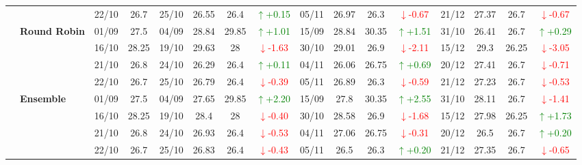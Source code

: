 {\begin{longtable}{llcc|cccc|cccc|cccc}
&
& 22/10 & 26.7 & 25/10 & 26.55 & 26.4 & \textcolor{green}{\(\uparrow\)+0.15} & 05/11 & 26.97 & 26.3 & \textcolor{red}{\(\downarrow\)-0.67} & 21/12 & 27.37 & 26.7 & \textcolor{red}{\(\downarrow\)-0.67} \\
\cmidrule(lr){2-16}


& \textbf{Round Robin}
& 01/09 & 27.5 & 04/09 & 28.84 & 29.85 & \textcolor{green}{\(\uparrow\)+1.01} & 15/09 & 28.84 & 30.35 & \textcolor{green}{\(\uparrow\)+1.51} & 31/10 & 26.41 & 26.7 & \textcolor{green}{\(\uparrow\)+0.29} \\

& 
& 16/10 & 28.25 & 19/10 & 29.63 & 28 & \textcolor{red}{\(\downarrow\)-1.63} & 30/10 & 29.01 & 26.9 & \textcolor{red}{\(\downarrow\)-2.11} & 15/12 & 29.3 & 26.25 & \textcolor{red}{\(\downarrow\)-3.05} \\

& 
& 21/10 & 26.8 & 24/10 & 26.29 & 26.4 & \textcolor{green}{\(\uparrow\)+0.11} & 04/11 & 26.06 & 26.75 & \textcolor{green}{\(\uparrow\)+0.69} & 20/12 & 27.41 & 26.7 & \textcolor{red}{\(\downarrow\)-0.71} \\

&
& 22/10 & 26.7 & 25/10 & 26.79 & 26.4 & \textcolor{red}{\(\downarrow\)-0.39} & 05/11 & 26.89 & 26.3 & \textcolor{red}{\(\downarrow\)-0.59} & 21/12 & 27.23 & 26.7 & \textcolor{red}{\(\downarrow\)-0.53} \\
\cmidrule(lr){2-16}


& \textbf{Ensemble}
& 01/09 & 27.5 & 04/09 & 27.65 & 29.85& \textcolor{green}{\(\uparrow\)+2.20} & 15/09 & 27.8 & 30.35 & \textcolor{green}{\(\uparrow\)+2.55} & 31/10 & 28.11 & 26.7 & \textcolor{red}{\(\downarrow\)-1.41} \\

& 
& 16/10 & 28.25 & 19/10 & 28.4 & 28 & \textcolor{red}{\(\downarrow\)-0.40} & 30/10 & 28.58 & 26.9 & \textcolor{red}{\(\downarrow\)-1.68} & 15/12 & 27.98 & 26.25 & \textcolor{green}{\(\uparrow\)+1.73} \\

& 
& 21/10 & 26.8 & 24/10 & 26.93 & 26.4 & \textcolor{red}{\(\downarrow\)-0.53} & 04/11 & 27.06 & 26.75 & \textcolor{red}{\(\downarrow\)-0.31} & 20/12 & 26.5 & 26.7 & \textcolor{green}{\(\uparrow\)+0.20} \\

&
& 22/10 & 26.7 & 25/10 & 26.83 & 26.4 & \textcolor{red}{\(\downarrow\)-0.43} & 05/11 & 26.5 & 26.3 & \textcolor{green}{\(\uparrow\)+0.20} & 21/12 & 27.35 & 26.7 & \textcolor{red}{\(\downarrow\)-0.65} \\
\midrule




\end{longtable}}
